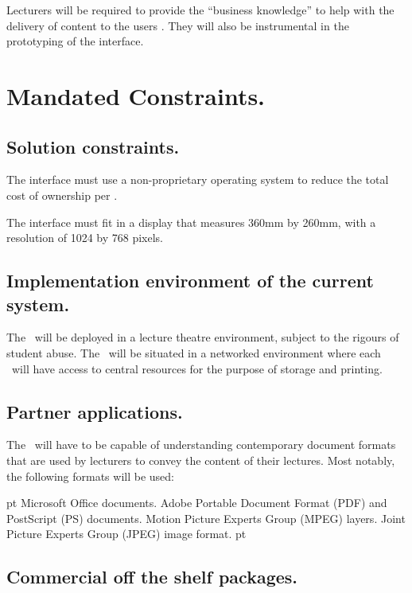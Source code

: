 	Lecturers will be required to provide the ``business knowledge'' to help with the delivery of content to the users \iDesk. They will also be instrumental in the prototyping of the interface.


\section{Mandated Constraints.}

\subsection{Solution constraints.}

The interface must use a non-proprietary operating system to reduce the total cost of ownership per \iDesk.

The interface must fit in a display that measures 360mm by 260mm, with a resolution of 1024 by 768 pixels.

\subsection{Implementation environment of the current system.}

The \iDesk\ will be deployed in a lecture theatre environment, subject to the rigours of student abuse. The \iDesk\ will be situated in a networked environment where each \iDesk\ will have access to central resources for the purpose of storage and printing.

\subsection{Partner applications.}

The \iDesk\ will have to be capable of understanding contemporary document formats that are used by lecturers to convey the content of their lectures. Most notably, the following formats will be used:

 pt
\items Microsoft Office documents.
\items Adobe Portable Document Format (PDF) and PostScript (PS) documents.
\items Motion Picture Experts Group (MPEG) layers. 
\items Joint Picture Experts Group (JPEG) image format.
 pt

\subsection{Commercial off the shelf packages.}

